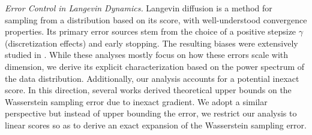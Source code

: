 \documentclass[11pt]{article}
\begin{document}
\noindent\textit{Error Control in Langevin Dynamics.}
%
Langevin diffusion is a method for sampling from a distribution based on its score, with well-understood convergence properties. Its primary error sources stem from the choice of a positive stepsize $\gamma$ (discretization effects) and early stopping. The resulting biases were extensively studied in \cite{roberts1996exponential, wibisono2018sampling, durmus2019analysis, dalalyan2022bounding, li2021sqrt}.
While these analyses mostly focus on how these errors scale with dimension, we derive its explicit characterization based on the power spectrum of the data distribution.
%
%
Additionally, our analysis accounts for a potential inexact score. In this direction, several works \cite{dalalyan2019user, block2020generative, laumont2022bayesian} derived theoretical upper bounds on the Wasserstein sampling error due to inexact gradient. We adopt a similar perspective but instead of upper bounding the error, we restrict our analysis to linear scores so as to derive an exact expansion of the Wasserstein sampling error. %
\end{document}
